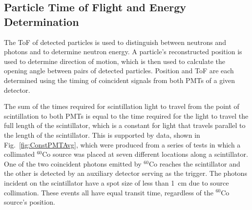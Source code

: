 \subsection{Particle Time of Flight and Energy Determination}
\label{ToF_reconstruction}
The ToF of detected particles is used to distinguish between neutrons and photons and to determine neutron energy.
A particle's reconstructed position is used to determine direction of motion, which is then used to calculate the opening angle between pairs of detected particles.
Position and ToF are each determined using the timing of coincident signals from both PMTs of a given detector.

The sum of the times required for scintillation light to travel from the point of scintillation to both PMTs is equal to the time required for the light to travel the full length of the scintillator, which is a constant for light that travels parallel to the length of the scintillator.
This is supported by data, shown in Fig.~\ref{fig:ConstPMTAvg}, which were produced from a series of tests in which a collimated $^{60}$Co source was placed at seven different locations along a scintillator.
One of the two coincident photons emitted by $^{60}$Co reaches the scintillator and the other is detected by an auxiliary detector serving as the trigger. 
The photons incident on the scintillator have a spot size of less than 1~cm due to source collimation.
These events all have equal transit time, regardless of the $^{60}$Co source's position. %

